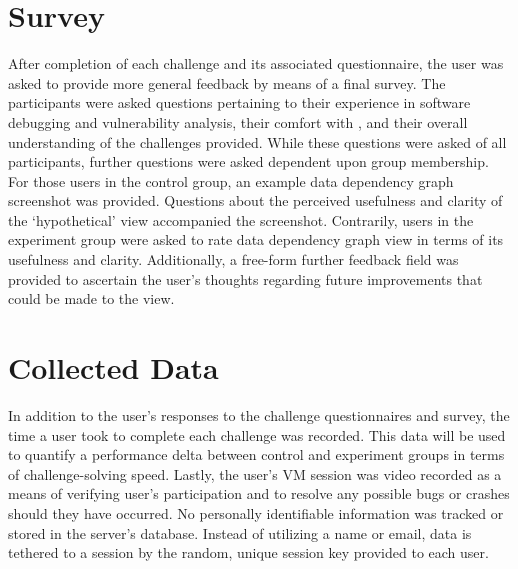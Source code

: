 \section{Survey}
After completion of each challenge and its associated questionnaire, the user was asked to provide more general feedback by means of a final survey. The participants were asked questions pertaining to their experience in software debugging and vulnerability analysis, their comfort with , and their overall understanding of the challenges provided. While these questions were asked of all participants, further questions were asked dependent upon group membership. For those users in the control group, an example data dependency graph screenshot was provided. Questions about the perceived usefulness and clarity of the ‘hypothetical’ view accompanied the screenshot. Contrarily, users in the experiment group were asked to rate data dependency graph view in terms of its usefulness and clarity. Additionally, a free-form further feedback field was provided to ascertain the user’s thoughts regarding future improvements that could be made to the view.

\section{Collected Data}
In addition to the user’s responses to the challenge questionnaires and survey, the time a user took to complete each challenge was recorded. This data will be used to quantify a performance delta between control and experiment groups in terms of challenge-solving speed. Lastly, the user’s VM session was video recorded as a means of verifying user’s participation and to resolve any possible bugs or crashes should they have occurred. No personally identifiable information was tracked or stored in the server’s database. Instead of utilizing a name or email, data is tethered to a session by the random, unique session key provided to each user.  